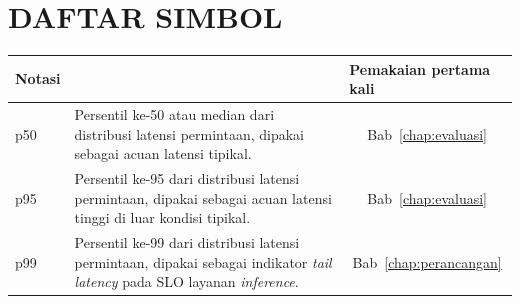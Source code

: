 \cleardoublepage
{}
{}
\chapter*{DAFTAR SIMBOL}
\label{chap:simbol}
\setcounter{chapter}{0}
\setcounter{section}{0}


\begin{longtable}{@{} l >{\raggedright\arraybackslash}p{8cm} c @{}}
\multicolumn{1}{l}{\textbf{Notasi}} & \multicolumn{1}{l}{\textbf{Deskripsi}} & \multicolumn{1}{l}{\parbox[c]{2.5cm}{\raggedright \textbf{Pemakaian pertama kali}}} \\
\hline

p50 & Persentil ke-50 atau median dari distribusi latensi permintaan, dipakai sebagai acuan latensi tipikal. & Bab~\ref{chap:evaluasi} \\

p95 & Persentil ke-95 dari distribusi latensi permintaan, dipakai sebagai acuan latensi tinggi di luar kondisi tipikal. & Bab~\ref{chap:evaluasi} \\

p99 & Persentil ke-99 dari distribusi latensi permintaan, dipakai sebagai indikator \textit{tail latency} pada SLO layanan \textit{inference}. & Bab~\ref{chap:perancangan} \\

\end{longtable}
